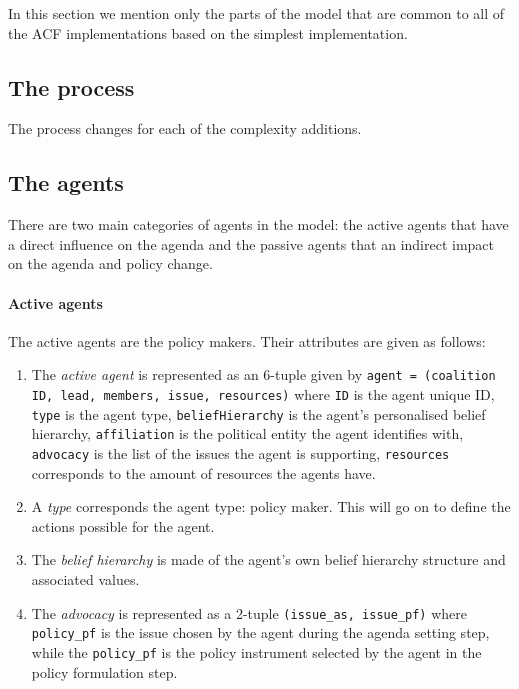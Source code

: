 \documentclass[11pt]{article}
\begin{document}
In this section we mention only the parts of the model that are common to all of the ACF implementations based on the simplest implementation.

\subsection{The process}

The process changes for each of the complexity additions.


\subsection{The agents}

There are two main categories of agents in the model: the active agents that have a direct influence on the agenda and the passive agents that an indirect impact on the agenda and policy change.

\paragraph{Active agents}

The active agents are the policy makers. Their attributes are given as follows:

\begin{enumerate}

\item The \emph{active agent} is represented as an 6-tuple given by \texttt{agent = (coalition ID, lead, members, issue, resources)} where
\texttt{ID} is the agent unique ID,
\texttt{type} is the agent type, 
\texttt{beliefHierarchy} is the agent's personalised belief hierarchy, 
\texttt{affiliation} is the political entity the agent identifies with,  
\texttt{advocacy} is the list of the issues the agent is supporting,
\texttt{resources} corresponds to the amount of resources the agents have.

\item A \emph{type} corresponds the agent type: policy maker. This will go on to define the actions possible for the agent.

\item The \emph{belief hierarchy} is made of the agent's own belief hierarchy structure and associated values.

\item The \emph{advocacy} is represented as a 2-tuple \texttt{(issue\_as, issue\_pf)} where \texttt{policy\_pf} is the issue chosen by the agent during the agenda setting step, while the \texttt{policy\_pf} is the policy instrument selected by the agent in the policy formulation step.

\end{enumerate}
\end{document}
